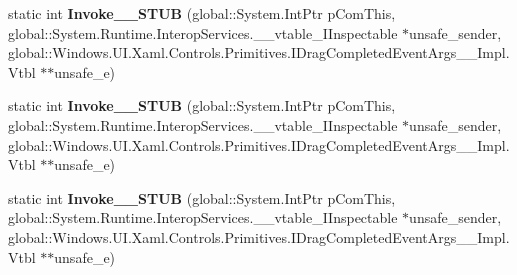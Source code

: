 \begin{DoxyCompactItemize}
\item 
\mbox{\label{struct_windows_1_1_u_i_1_1_xaml_1_1_controls_1_1_primitives_1_1_drag_completed_event_handler_____impl_1_1_vtbl_af75ab3ceb9a996ce5f70134534db5079}} 
static int {\bfseries Invoke\+\_\+\+\_\+\+S\+T\+UB} (global\+::\+System.\+Int\+Ptr p\+Com\+This, global\+::\+System.\+Runtime.\+Interop\+Services.\+\_\+\+\_\+vtable\+\_\+\+I\+Inspectable $\ast$unsafe\+\_\+sender, global\+::\+Windows.\+U\+I.\+Xaml.\+Controls.\+Primitives.\+I\+Drag\+Completed\+Event\+Args\+\_\+\+\_\+\+Impl.\+Vtbl $\ast$$\ast$unsafe\+\_\+e)
\item 
\mbox{\label{struct_windows_1_1_u_i_1_1_xaml_1_1_controls_1_1_primitives_1_1_drag_completed_event_handler_____impl_1_1_vtbl_af75ab3ceb9a996ce5f70134534db5079}} 
static int {\bfseries Invoke\+\_\+\+\_\+\+S\+T\+UB} (global\+::\+System.\+Int\+Ptr p\+Com\+This, global\+::\+System.\+Runtime.\+Interop\+Services.\+\_\+\+\_\+vtable\+\_\+\+I\+Inspectable $\ast$unsafe\+\_\+sender, global\+::\+Windows.\+U\+I.\+Xaml.\+Controls.\+Primitives.\+I\+Drag\+Completed\+Event\+Args\+\_\+\+\_\+\+Impl.\+Vtbl $\ast$$\ast$unsafe\+\_\+e)
\item 
\mbox{\label{struct_windows_1_1_u_i_1_1_xaml_1_1_controls_1_1_primitives_1_1_drag_completed_event_handler_____impl_1_1_vtbl_af75ab3ceb9a996ce5f70134534db5079}} 
static int {\bfseries Invoke\+\_\+\+\_\+\+S\+T\+UB} (global\+::\+System.\+Int\+Ptr p\+Com\+This, global\+::\+System.\+Runtime.\+Interop\+Services.\+\_\+\+\_\+vtable\+\_\+\+I\+Inspectable $\ast$unsafe\+\_\+sender, global\+::\+Windows.\+U\+I.\+Xaml.\+Controls.\+Primitives.\+I\+Drag\+Completed\+Event\+Args\+\_\+\+\_\+\+Impl.\+Vtbl $\ast$$\ast$unsafe\+\_\+e)
\item 
\mbox{\label{struct_windows_1_1_u_i_1_1_xaml_1_1_controls_1_1_primitives_1_1_drag_completed_event_handler_____impl_1_1_vtbl_af75ab3ceb9a996ce5f70134534db5079}} 
$$
\end{DoxyCompactItemize}
